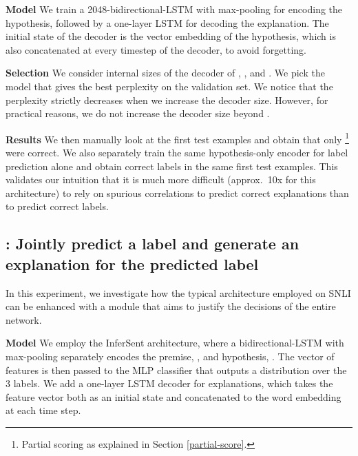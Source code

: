 \textbf{Model   } We train a 2048-bidirectional-LSTM with max-pooling for encoding the hypothesis, followed by a one-layer LSTM for decoding the explanation. The initial state of the decoder is the vector embedding of the hypothesis, which is also concatenated at every timestep of the decoder, to avoid forgetting. 


\textbf{Selection   } We consider internal sizes of the decoder of , ,  and . We pick the model that gives the best perplexity on the validation set. We notice that the perplexity strictly decreases when we increase the decoder size. However, for practical reasons, we do not increase the decoder size beyond .


\textbf{Results   } We then manually look at the first  test examples and obtain that only \footnote{Partial scoring as explained in Section \ref{partial-score}.} were correct. We also separately train the same hypothesis-only encoder for label prediction alone and obtain  correct labels in the same first  test examples. This validates our intuition that it is much more difficult (approx.\ 10x for this architecture) to rely on spurious correlations to predict correct explanations than to predict correct labels. 



\subsection{\expone: Jointly predict a label and generate an explanation for the predicted label}

In this experiment, we investigate how the typical architecture employed on SNLI can be enhanced with a module that aims to justify the decisions of the entire network. 


\textbf{Model   } We employ the InferSent \cite{infersent} architecture, where a bidirectional-LSTM with max-pooling separately encodes the premise, , and hypothesis, . The vector of features  is then passed to the MLP classifier that outputs a distribution over the 3 labels.  We add a one-layer LSTM decoder for explanations, which takes the feature vector  both as an initial state and concatenated to the word embedding at each time step.


